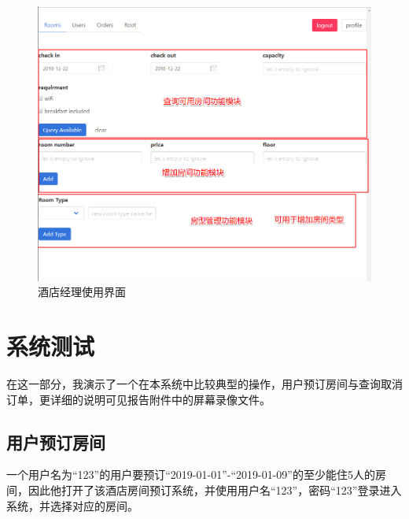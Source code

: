 \documentclass{myreport}
\begin{document}
\begin{figure}[htp]
    \centering
    \includegraphics[width=15cm]{figure/2018-12-22-15-00-55.png}
    \caption{酒店经理使用界面}
    \label{fig:admin-mode}
\end{figure}



\chapter{系统测试}

在这一部分，我演示了一个在本系统中比较典型的操作，用户预订房间与查询取消订单，更详细的说明可见报告附件中的屏幕录像文件。

\section{用户预订房间}

一个用户名为“123”的用户要预订“2019-01-01”-“2019-01-09”的至少能住5人的房间，因此他打开了该酒店房间预订系统，并使用用户名“123”，密码“123”登录进入系统，并选择对应的房间。
\end{document}
